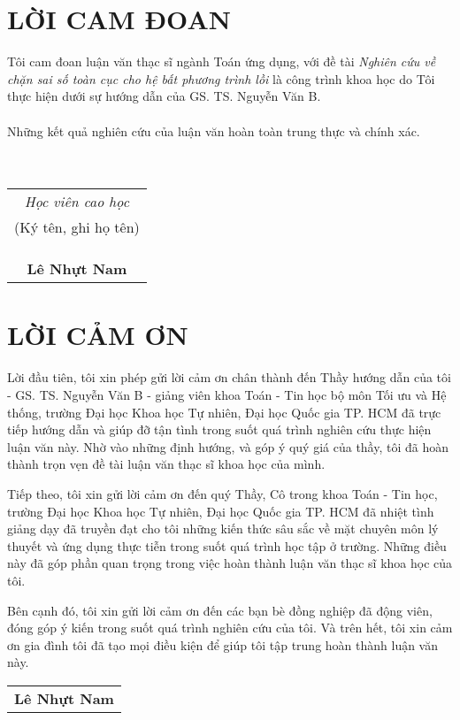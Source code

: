 \chapter*{LỜI CAM ĐOAN}
Tôi cam đoan luận văn thạc sĩ ngành Toán ứng dụng, với đề tài \emph{Nghiên cứu về chặn sai số toàn cục cho hệ bất phương trình lồi} là công trình khoa học do Tôi thực hiện dưới sự hướng dẫn của GS. TS. Nguyễn Văn B. 
\\\\
Những kết quả nghiên cứu của luận văn hoàn toàn trung thực và chính xác.
\\\\\\
\begin{flushright}
	
	\begin{tabular}{@{}c@{}}
		\textit{Học viên cao học}\\
		(Ký tên, ghi họ tên)\\\\\\\\ 
        \textbf{Lê Nhựt Nam}
	\end{tabular}
	
\end{flushright}
\thispagestyle{empty}
\chapter*{LỜI CẢM ƠN}

Lời đầu tiên, tôi xin phép gửi lời cảm ơn chân thành đến Thầy hướng dẫn của tôi - GS. TS. Nguyễn Văn B - giảng viên khoa Toán - Tin học bộ môn Tối ưu và Hệ thống, trường Đại học Khoa học Tự nhiên, Đại học Quốc gia TP. HCM đã trực tiếp hướng dẫn và giúp đỡ tận tình trong suốt quá trình nghiên cứu thực hiện luận văn này. Nhờ vào những định hướng, và góp ý quý giá của thầy, tôi đã hoàn thành trọn vẹn đề tài luận văn thạc sĩ khoa học của mình.

Tiếp theo, tôi xin gửi lời cảm ơn đến quý Thầy, Cô trong khoa Toán - Tin học, trường Đại học Khoa học Tự nhiên, Đại học Quốc gia TP. HCM đã nhiệt tình giảng dạy đã truyền đạt cho tôi những kiến thức sâu sắc về mặt chuyên môn lý thuyết và ứng dụng thực tiễn trong suốt quá trình học tập ở trường. Những điều này đã góp phần quan trọng trong việc hoàn thành luận văn thạc sĩ khoa học của tôi.

Bên cạnh đó, tôi xin gửi lời cảm ơn đến các bạn bè đồng nghiệp đã động viên, đóng góp ý kiến trong suốt quá trình nghiên cứu của tôi. Và trên hết, tôi xin cảm ơn gia đình tôi đã tạo mọi điều kiện để giúp tôi tập trung hoàn thành luận văn này.

\begin{flushright}
		\begin{tabular}{@{}c@{}}
			\bfseries Lê Nhựt Nam
		\end{tabular}
\end{flushright}
\thispagestyle{empty}